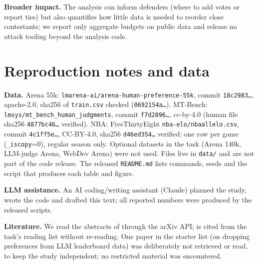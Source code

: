 \documentclass{article}
\begin{document}
\textbf{Broader impact.} The analysis can inform defenders (where to add votes or report ties) but also quantifies how little data is needed to reorder close contestants; we report only aggregate budgets on public data and release no attack tooling beyond the analysis code.




\appendix
\section{Reproduction notes and data}\label{app:repro}
\textbf{Data.} Arena 55k: \texttt{lmarena-ai/arena-human-preference-55k}, commit \texttt{18c2983\dots}, apache-2.0, sha256 of \texttt{train.csv} checked (\texttt{0692154a\dots}). MT-Bench: \texttt{lmsys/mt\_bench\_human\_judgments}, commit \texttt{f7d2896\dots}, cc-by-4.0 (human file sha256 \texttt{4877bc46\dots} verified). NBA: FiveThirtyEight \texttt{nba-elo/nbaallelo.csv}, commit \texttt{4c1ff5e\dots}, CC-BY-4.0, sha256 \texttt{d46ed354\dots} verified; one row per game (\texttt{\_iscopy}=0), regular season only. Optional datasets in the task (Arena 140k, LLM-judge Arena, WebDev Arena) were not used. Files live in \texttt{data/} and are not part of the code release. The released \texttt{README.md} lists commands, seeds and the script that produces each table and figure.

\textbf{LLM assistance.} An AI coding/writing assistant (Claude) planned the study, wrote the code and drafted this text; all reported numbers were produced by the released scripts.

\textbf{Literature.} We read the abstracts of \citet{chiang2024,zheng2023,koh2017,broderick2020,min2025,singh2025} through the arXiv API; \citet{bradley1952} is cited from the task's reading list without re-reading. One paper in the starter list (on dropping preferences from LLM leaderboard data) was deliberately not retrieved or read, to keep the study independent; no restricted material was encountered.
\end{document}
